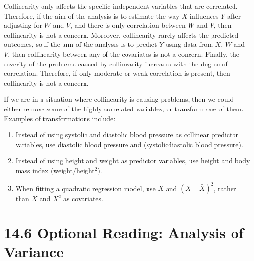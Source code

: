 \documentclass[letterpaper,10pt,english]{jupyterBook}
\begin{document}
\sphinxAtStartPar
Collinearity only affects the specific independent variables that are correlated. Therefore, if the aim of the analysis is to estimate the way \(X\) influences \(Y\) after adjusting for \(W\) and \(V\), and there is only correlation between \(W\) and \(V\), then collinearity is not a concern. Moreover, collinearity rarely affects the predicted outcomes, so if the aim of the analysis is to predict \(Y\) using data from \(X\), \(W\) and \(V\), then collinearity between any of the covariates is not a concern. Finally, the severity of the problems caused by collinearity increases with the degree of correlation. Therefore, if only moderate or weak correlation is present, then collinearity is not a concern.

\sphinxAtStartPar
If we are in a situation where collinearity is causing problems, then we could either remove some of the highly correlated variables, or transform one of them. Examples of transformations include:
\begin{enumerate}
%
\item {} 
\sphinxAtStartPar
Instead of using systolic and diastolic blood pressure as collinear predictor variables, use diastolic blood pressure and (systolic\sphinxhyphen{}diastolic blood pressure).

\item {} 
\sphinxAtStartPar
Instead of using height and weight as predictor variables, use height and body mass index (weight/height\(^2\)).

\item {} 
\sphinxAtStartPar
When fitting a quadratic regression model, use \(X\) and \((X-\bar{X})^2\), rather than \(X\) and \(X^2\) as covariates.

\end{enumerate}


\section{14.6 Optional Reading: Analysis of Variance}
\label{\detokenize{14.g. Linear Regression III:optional-reading-analysis-of-variance}}\label{\detokenize{14.g. Linear Regression III::doc}}
\end{document}
